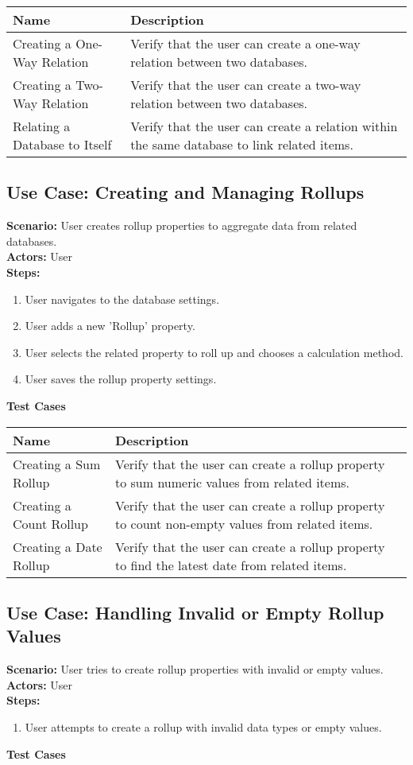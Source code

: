 \documentclass{article}
\begin{document}
            \begin{longtable}{|p{}|p{}|}
            \hline
            \textbf{Name} & \textbf{Description} \\
            \hline
            Creating a One-Way Relation & Verify that the user can create a one-way relation between two databases. \\
\hline
Creating a Two-Way Relation & Verify that the user can create a two-way relation between two databases. \\
\hline
Relating a Database to Itself & Verify that the user can create a relation within the same database to link related items. \\
\hline
\end{longtable}\subsection{\textbf{Use Case: Creating and Managing Rollups}}
\textbf{Scenario:} User creates rollup properties to aggregate data from related databases.\\
\textbf{Actors:} User\\
\textbf{Steps:}
\begin{enumerate}
\item User navigates to the database settings.
\item User adds a new 'Rollup' property.
\item User selects the related property to roll up and chooses a calculation method.
\item User saves the rollup property settings.
\end{enumerate}
\textbf{Test Cases}

            \begin{longtable}{|p{}|p{}|}
            \hline
            \textbf{Name} & \textbf{Description} \\
            \hline
            Creating a Sum Rollup & Verify that the user can create a rollup property to sum numeric values from related items. \\
\hline
Creating a Count Rollup & Verify that the user can create a rollup property to count non-empty values from related items. \\
\hline
Creating a Date Rollup & Verify that the user can create a rollup property to find the latest date from related items. \\
\hline
\end{longtable}\subsection{\textbf{Use Case: Handling Invalid or Empty Rollup Values}}
\textbf{Scenario:} User tries to create rollup properties with invalid or empty values.\\
\textbf{Actors:} User\\
\textbf{Steps:}
\begin{enumerate}
\item User attempts to create a rollup with invalid data types or empty values.
\end{enumerate}
\textbf{Test Cases}
\end{document}
